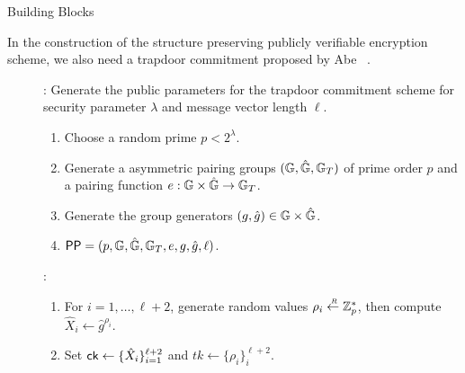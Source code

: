 \begin{subsection}{Building Blocks}

  In the construction of the structure preserving publicly verifiable encryption scheme, we also need a trapdoor commitment proposed by Abe \etal~\cite{DBLP:conf/eurocrypt/AbeKOT15}.

  \begin{description}
  \item[]: Generate the public parameters for the trapdoor commitment scheme for security parameter $\lambda$ and message vector length $\ell$. 
    \begin{enumerate}
    \item Choose a random prime $p< 2^{\lambda}$.
    \item Generate a asymmetric pairing groups $(\mathbb{G}, \hat{\mathbb{G}}, \mathbb{G}_T)$ of prime order $p$ and a pairing function $e : \mathbb{G} \times \hat{\mathbb{G}} \to \mathbb{G}_T$.
    \item Generate the group generators $(g, \hat{g}) \in \mathbb{G} \times \hat{\mathbb{G}}$.	
    \item $\mathsf{PP} = (p, \mathbb{G}, \hat{\mathbb{G}}, \mathbb{G}_T, e, g, \hat{g},\ell)$.
    \end{enumerate}

  \item[]:
    \begin{enumerate}
    \item For $i = 1, \dots, \ell+2$, generate random values $\rho_i \stackrel{{\scriptscriptstyle \mkern4mu R}}{\gets} \mathbb{Z}_p^*$, then compute $\hat{X}_i \gets \hat{g}^{\rho_i}$.
    \item Set $\mathsf{ck} \gets \{\hat{X}_i\}_{i = 1}^{\ell+2}$ and $tk \gets \{\rho_i\}_i^{\ell+2}$.
    \end{enumerate}



\end{description}
\end{subsection}
